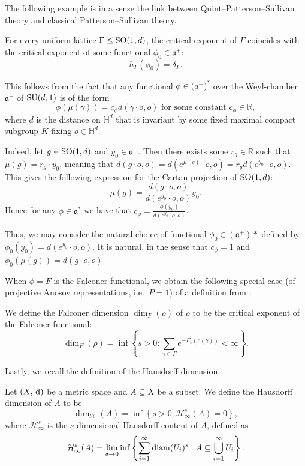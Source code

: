 \documentclass{report}
\begin{document}
The following example is in a sense the link between Quint--Patterson--Sullivan theory and classical Patterson--Sullivan theory.
\begin{example}
    \label{ex:critical_exponent}
    For every uniform lattice $\Gamma \leq \operatorname{{\mathrm{SO}}}(1,d)$, the critical exponent of $\Gamma$ coincides with the critical exponent of some functional $\phi_0 \in \mathfrak a^+$:
    \[
    h_\Gamma (\phi_0) = \delta_\Gamma.
    \]
    
    This follows from the fact that any functional $\phi \in \mathfrak (a^+)^*$ over the Weyl-chamber $\mathfrak a^+$ of $\operatorname{{\mathrm{SU}}}(d,1)$ is of the form
    \[
        \phi(\mu(\gamma)) = c_\phi d(\gamma \cdot o, o) \text{ for some constant } c_\phi \in \mathbb R,
    \]
    where $d$ is the distance on $\mathbb H^d$ that is invariant by some fixed maximal compact subgroup $K$ fixing $o \in \mathbb H^d$.

    Indeed, let $g \in \operatorname{{\mathrm{SO}}}(1, d)$ and $y_0 \in \mathfrak a^+$.
    Then there exists some $r_g \in \mathbb R$ such that $\mu(g) = r_g \cdot y_0$, meaning that
    $d(g \cdot o, o) = d(e^{\mu(g)} \cdot o, o) = r_g d(e^{y_0} \cdot o, o)$.
    This gives the following expression for the Cartan projection of $\operatorname{{\mathrm{SO}}}(1,d)$:
    \[
    \mu(g) = \frac{d(g \cdot o, o)}{d(e^{y_0} \cdot o, o)} y_0.
    \]
    Hence for any $\phi \in \mathfrak a^*$ we have that $c_\phi = \frac{\phi(y_0)}{d(e^{y_0} \cdot o, o)}$.

    Thus, we may consider the natural choice of functional $\phi_0 \in (\mathfrak a^+)*$ defined by $\phi_0(y_0) = d(e^{y_0} \cdot o, o)$.
    It is natural, in the sense that $c_\phi = 1$ and $\phi_0(\mu(g)) = d(g \cdot o, o)$
\end{example}


When $\phi = F$ is the Falconer functional, we obtain the following special case (of projective Anosov representations, i.e.\ $P = {1}$) of a definition from \cite{ledrappier_dimension_2023}:
\begin{definition}
    We define the Falconer dimension $\dim_F(\rho)$ of $\rho$ to be the critical exponent of the Falconer functional:
    \[
        \dim_F(\rho) = \inf
        \left\{
            s > 0: \sum_{\gamma \in \Gamma} e^{-F_s(\rho(\gamma))} < \infty
        \right\}.
    \]
\end{definition}

Lastly, we recall the definition of the Hausdorff dimension:
\begin{definition}\label{def:hausdorff_dimension}
    Let $(X,\,\mathrm{d})$ be a metric space and $A \subseteq X$ be a subset.
    We define the Hausdorff dimension of $A$ to be
    \[
        \dim_{\mathcal H}(A) = \inf
        \left\{
            s > 0: \mathcal H^s_\infty(A) = 0
        \right\},
    \]
    where $\mathcal H^s_\infty$ is the $s$-dimensional Hausdorff content of $A$, defined as
    \[
        \mathcal H^s_\infty(A) = \lim_{\delta \to 0} \inf
        \left\{
            \sum_{i=1}^\infty \operatorname{diam}(U_i)^s: A \subseteq \bigcup_{i=1}^\infty U_i
        \right\}.
    \]
\end{definition}
\end{document}
